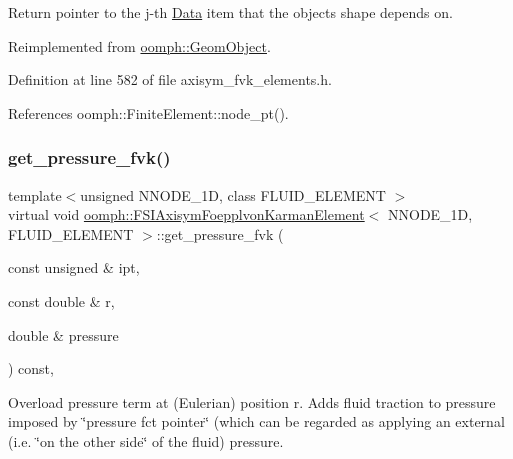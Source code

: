 Return pointer to the j-\/th \hyperlink{classoomph_1_1Data}{Data} item that the object\textquotesingle{}s shape depends on. 



Reimplemented from \hyperlink{classoomph_1_1GeomObject_ae1940fc6a3050e645c3882f2f6f3a202}{oomph\+::\+Geom\+Object}.



Definition at line 582 of file axisym\+\_\+fvk\+\_\+elements.\+h.



References oomph\+::\+Finite\+Element\+::node\+\_\+pt().

\mbox{\label{classoomph_1_1FSIAxisymFoepplvonKarmanElement_a96b9277c8b9ff3ca40f25851fa30b34e}} 
\subsubsection{\texorpdfstring{get\+\_\+pressure\+\_\+fvk()}{get\_pressure\_fvk()}}
{\footnotesize\ttfamily template$<$unsigned N\+N\+O\+D\+E\+\_\+1D, class F\+L\+U\+I\+D\+\_\+\+E\+L\+E\+M\+E\+NT $>$ \\
virtual void \hyperlink{classoomph_1_1FSIAxisymFoepplvonKarmanElement}{oomph\+::\+F\+S\+I\+Axisym\+Foepplvon\+Karman\+Element}$<$ N\+N\+O\+D\+E\+\_\+1D, F\+L\+U\+I\+D\+\_\+\+E\+L\+E\+M\+E\+NT $>$\+::get\+\_\+pressure\+\_\+fvk (\begin{DoxyParamCaption}\item[{const unsigned \&}]{ipt,  }\item[{const double \&}]{r,  }\item[{double \&}]{pressure }\end{DoxyParamCaption}) const\hspace{0.3cm}{\ttfamily [inline]}, {\ttfamily [virtual]}}



Overload pressure term at (Eulerian) position r. Adds fluid traction to pressure imposed by \char`\"{}pressure fct pointer\char`\"{} (which can be regarded as applying an external (i.\+e. \char`\"{}on the other side\char`\"{} of the fluid) pressure. 



